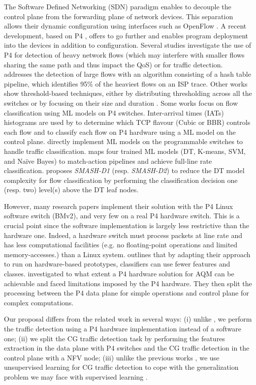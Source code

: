 
The Software Defined Networking (SDN) paradigm \cite{Nunes2014ASO} enables to decouple the control plane from the forwarding plane of network devices. This separation allows their dynamic configuration using interfaces such as OpenFlow \cite{OpenFlow}. A recent development, based on P4 \cite{P4}, offers to go further and enables program deployment into the devices in addition to configuration. Several studies investigate the use of P4 for detection of heavy network flows (which may interfere with smaller flows sharing the same path and thus impact the QoS) or for traffic detection. 
\cite{P4_HeavyHitter} addresses the detection of large flows with an algorithm consisting of a hash table pipeline, which identifies 95\% of the heaviest flows on an ISP trace. Other works show threshold-based techniques, either by distributing thresholding across all the switches \cite{P4_HeavyHitter2} or by focusing on their size and duration \cite{P4_HeavyHitter3}. Some works focus on flow classification using ML models on P4 switches. Inter-arrival times (IATs) histograms are used by \cite{P4_Seior} to determine which TCP flavour (Cubic or BBR) controls each flow and to classify each flow on P4 hardware using a ML model on the control plane.  
\cite{P4_Switches_ML, P4_Flow_Classif} directly implement ML models on the programmable switches to handle traffic classification.
\cite{P4_Switches_ML} maps four trained ML models (DT, K-means, SVM, and Naïve Bayes) to match-action pipelines and achieve full-line rate classification.
\cite{P4_Flow_Classif} proposes \textit{SMASH-D1} (resp. \textit{SMASH-D2}) to reduce the DT model complexity for flow classification by performing the classification decision one (resp. two) level(s) above the DT leaf nodes.

However, many research papers implement their solution with the P4 Linux software switch (BMv2), and very few on a real P4 hardware switch. This is a crucial point since the  software implementation is largely less restrictive than the hardware one. Indeed, a hardware switch must process packets at line rate and has less computational facilities (e.g. no floating-point operations and limited memory-accesses.)  than a Linux system. \cite{P4_Switches_ML} outlines that by adapting their approach to run on hardware-based prototypes, classifiers can use fewer features and classes.  \cite{9838674} investigated to what extent a P4 hardware solution for AQM can be achievable and faced limitations imposed by the P4 hardware. They then split the processing between the P4 data plane for simple operations and control plane for complex computations. 

Our proposal differs from the related work in several ways: (i) unlike \cite{P4_HeavyHitter, P4_HeavyHitter3, P4_Flow_Classif}, we perform the traffic detection using a P4 hardware implementation instead of a software one; (ii) we split the CG traffic detection task by performing the features extraction in the data plane with P4 switches and the CG traffic detection in the control plane with a NFV node; (iii) unlike the previous works \cite{NOMS}, we use unsupervised learning for CG traffic detection to cope with the generalization problem we may face with supervised learning \cite{LearningClassif}.

